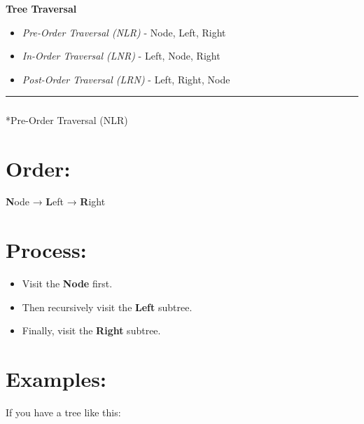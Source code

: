 \documentclass[
  letterpaper,
  DIV=11,
  numbers=noendperiod]{scrreprt}
\makeatletter
\let\oldsubparagraph\subparagraph
\renewcommand{\subparagraph}{
    \@ifstar
      \xxxSubParagraphStar
      \xxxSubParagraphNoStar
  }
\newcommand{\xxxSubParagraphStar}[1]{\oldsubparagraph*{#1}\mbox{}}
\newcommand{\xxxSubParagraphNoStar}[1]{\oldsubparagraph{#1}\mbox{}}
\providecommand{\tightlist}{%
  \setlength{\itemsep}{0pt}\setlength{\parskip}{0pt}}
\makeatother
\begin{document}
\begin{tcolorbox}[enhanced jigsaw, colframe=quarto-callout-note-color-frame, toprule=.15mm, bottomrule=.15mm, rightrule=.15mm, colback=white, breakable, arc=.35mm, opacityback=0, left=2mm, leftrule=.75mm]

\vspace{-3mm}\textbf{Tree Traversal}\vspace{3mm}

\begin{itemize}
\tightlist
\item
  \emph{Pre-Order Traversal (NLR)} - Node, Left, Right
\item
  \emph{In-Order Traversal (LNR)} - Left, Node, Right
\item
  \emph{Post-Order Traversal (LRN)} - Left, Right, Node
\end{itemize}

\end{tcolorbox}

\begin{center}\rule{0.5\linewidth}{0.5pt}\end{center}

\subparagraph*{Pre-Order Traversal (NLR)}\label{pre-order-traversal-nlr}

\section{Order:}

\textbf{N}ode → \textbf{L}eft → \textbf{R}ight

\section{Process:}

\begin{itemize}
\tightlist
\item
  Visit the \textbf{Node} first.
\item
  Then recursively visit the \textbf{Left} subtree.
\item
  Finally, visit the \textbf{Right} subtree.
\end{itemize}

\section{Examples:}

If you have a tree like this:
\end{document}
